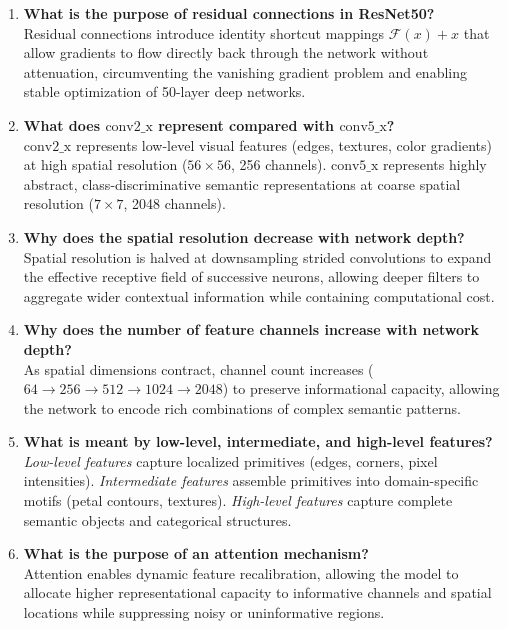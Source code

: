 \documentclass[11pt,a4paper]{article}
\begin{document}
\begin{enumerate}[label=\textbf{\arabic*.}]
    \item \textbf{What is the purpose of residual connections in ResNet50?} \\
    Residual connections introduce identity shortcut mappings $\mathcal{F}(x) + x$ that allow gradients to flow directly back through the network without attenuation, circumventing the vanishing gradient problem and enabling stable optimization of 50-layer deep networks.

    \item \textbf{What does $\text{conv2\_x}$ represent compared with $\text{conv5\_x}$?} \\
    $\text{conv2\_x}$ represents low-level visual features (edges, textures, color gradients) at high spatial resolution ($56 \times 56$, 256 channels). $\text{conv5\_x}$ represents highly abstract, class-discriminative semantic representations at coarse spatial resolution ($7 \times 7$, 2048 channels).

    \item \textbf{Why does the spatial resolution decrease with network depth?} \\
    Spatial resolution is halved at downsampling strided convolutions to expand the effective receptive field of successive neurons, allowing deeper filters to aggregate wider contextual information while containing computational cost.

    \item \textbf{Why does the number of feature channels increase with network depth?} \\
    As spatial dimensions contract, channel count increases ($64 \to 256 \to 512 \to 1024 \to 2048$) to preserve informational capacity, allowing the network to encode rich combinations of complex semantic patterns.

    \item \textbf{What is meant by low-level, intermediate, and high-level features?} \\
    \textit{Low-level features} capture localized primitives (edges, corners, pixel intensities). \textit{Intermediate features} assemble primitives into domain-specific motifs (petal contours, textures). \textit{High-level features} capture complete semantic objects and categorical structures.

    \item \textbf{What is the purpose of an attention mechanism?} \\
    Attention enables dynamic feature recalibration, allowing the model to allocate higher representational capacity to informative channels and spatial locations while suppressing noisy or uninformative regions.


\end{enumerate}
\end{document}
